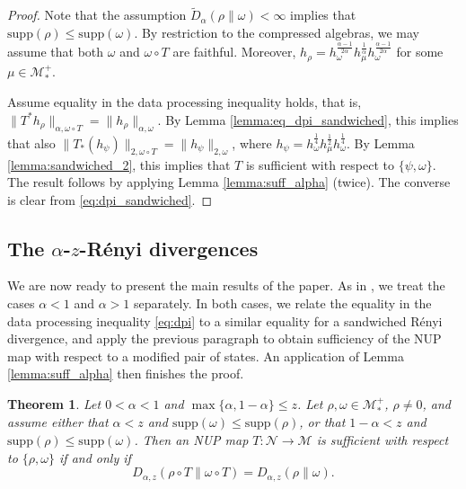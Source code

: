 \documentclass[12pt]{article}
\def\Ne{\mathcal N}
\def\Me{\mathcal M}
\def\supp{\mathrm{supp}}
\newtheorem{theorem}{Theorem}
\theoremstyle{definition}
\theoremstyle{remark}
\begin{document}
\begin{proof} 
Note that the assumption $\tilde D_{\alpha}(\rho\|\omega)<\infty$ implies that
$\mathrm{supp}(\rho)\le \mathrm{supp}(\omega)$. %
By restriction to the compressed algebras, we may assume that both $\omega$ and $\omega\circ T$ are  faithful. Moreover,
$h_\rho=h_\omega^{\frac{\alpha-1}{2\alpha}}h_\mu^{\frac1{\alpha}}h_\omega^{\frac{\alpha-1}{2\alpha}}$
for some $\mu\in \Me_*^+$. 

Assume  equality in the data processing inequality holds, that is,
$\|T^*h_\rho\|_{\alpha,\omega\circ T}=\|h_\rho\|_{\alpha,\omega}$.  By Lemma
\ref{lemma:eq_dpi_sandwiched}, this implies that also  
$\|T_*(h_\psi)\|_{2,\omega\circ
T}=\|h_\psi\|_{2,\omega}$, where 
$h_\psi=h_\omega^{\frac14}h_\mu^{\frac12}h_\omega^{\frac14}$. By Lemma
\ref{lemma:sandwiched_2}, this implies that $T$ is sufficient with respect to
$\{\psi,\omega\}$. The result follows by applying Lemma \ref{lemma:suff_alpha} (twice). 
The converse is clear from \eqref{eq:dpi_sandwiched}.



\end{proof}


\subsection{The $\alpha$-$z$-R\'enyi divergences}
\label{sec:recovery}

We are now ready to present the main results of the paper. As in \cite{hiai2024alphaz}, we
treat the cases $\alpha<1$ and $\alpha>1$ separately. In both cases, we relate the
equality in the data processing inequality \eqref{eq:dpi} to a similar equality for a
sandwiched R\'enyi divergence, and apply the previous paragraph to obtain sufficiency of the NUP map with respect to a modified pair of states. An application of Lemma
\ref{lemma:suff_alpha} then finishes the proof. 

\begin{theorem}\label{thm:alphale} Let $0 < \alpha < 1$ and $\max\{\alpha, 1 - \alpha\}
\le z$. Let $\rho,\omega \in  \Me_*^+$, $\rho\ne 0$, and assume either
that $\alpha < z$  and $\supp(\omega) \le \supp(\rho)$, or that $1 -\alpha < z$ and
$\supp(\rho) \le \supp(\omega)$. Then an NUP map $T : \Ne \to  \Me$  is sufficient  with
respect to $\{\rho, \omega\}$ if and only if
\[
D_{\alpha,z} (\rho \circ T\|\omega \circ T) = D_{\alpha,z} (\rho\|\omega). 
\]
\end{theorem}
\end{document}
